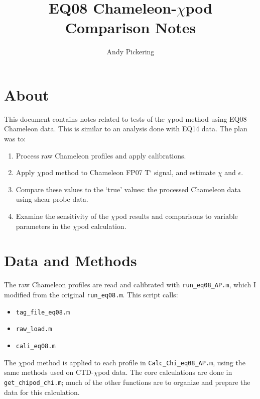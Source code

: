 \documentclass[11pt]{article}
\title{EQ08 Chameleon-$\chi$pod Comparison Notes}
\author{Andy Pickering}
\begin{document}
\maketitle

\tableofcontents
\newpage

\section{About}

This document contains notes related to tests of the $\chi$pod method using EQ08 Chameleon data. This is similar to an analysis done with EQ14 data. The plan was to:

\begin{enumerate}
\item Process raw Chameleon profiles and apply calibrations.
\item Apply $\chi$pod method to Chameleon FP07 T` signal, and estimate $\chi$ and $\epsilon$.
\item Compare these values to the `true' values: the processed Chameleon data using shear probe data.
\item Examine the sensitivity of the $\chi$pod results and comparisons to variable parameters in the $\chi$pod calculation.
\end{enumerate}



\section{Data and Methods}

The raw Chameleon profiles are read and calibrated with \verb+run_eq08_AP.m+, which I modified from the original \verb+run_eq08.m+. This script calls:
\begin{itemize}
\item \verb+tag_file_eq08.m+
\item \verb+raw_load.m+
\item \verb+cali_eq08.m+
\end{itemize}

The $\chi$pod method is applied to each profile in \verb+Calc_Chi_eq08_AP.m+, using the same methods used on CTD-$\chi$pod data. The core calculations are done in \verb+get_chipod_chi.m+; much of the other functions are to organize and prepare the data for this calculation.



\clearpage
\newpage
\end{document}
